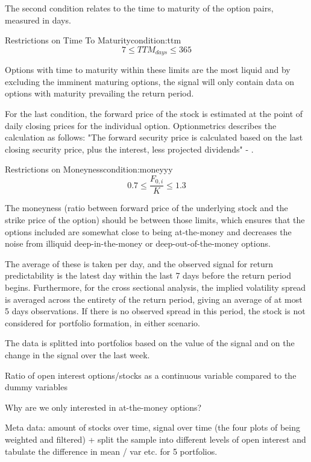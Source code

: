 The second condition relates to the time to maturity of the option pairs, measured in days.

\begin{mycondition}{Restrictions on Time To Maturity}{condition:ttm} 
	$$7 \leq TTM_{days}  \leq 365 $$
	
	Options with time to maturity within these limits are the most liquid and by excluding the imminent maturing options, the signal will only contain data on options with maturity prevailing the return period.
\end{mycondition}

For the last condition, the forward price of the stock is estimated at the point of daily closing prices for the individual option. Optionmetrics describes the calculation as follows: "The forward security price is calculated based on the last closing security price, plus the interest, less projected dividends" - \cite{optionmetrics}.

\begin{mycondition}{Restrictions on Moneyness}{condition:moneyyy}
	$$ 0.7 \leq \frac{F_{0,i}}{K} \leq 1.3 $$
	
	The moneyness (ratio between forward price of the underlying stock and the strike price of the option) should be between those limits, which ensures that the options included are somewhat close to being at-the-money and decreases the noise from illiquid deep-in-the-money or deep-out-of-the-money options.
\end{mycondition}


The average of these is taken per day, and the observed signal for return predictability is the latest day within the last 7 days before the return period begins. Furthermore, for the cross sectional analysis, the implied volatility spread is averaged across the entirety of the return period, giving an average of at most 5 days observations. If there is no observed spread in this period, the stock is not considered for portfolio formation, in either scenario.

The data is splitted into portfolios based on the value of the signal and on the change in the signal over the last week. 

Ratio of open interest options/stocks as a continuous variable compared to the dummy variables 


Why are we only interested in at-the-money options?

Meta data:
amount of stocks over time, signal over time (the four plots of being weighted and filtered) + split the sample into different levels of open interest and tabulate the difference in mean / var etc. for 5 portfolios.

